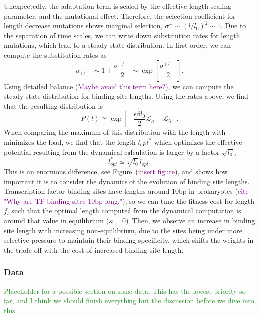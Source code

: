 \documentclass[10pt,a4paper]{article}
\newcommand{\purple}[1]{\textcolor{purple}{#1}}
\begin{document}
Unexpectedly, the adaptation term is scaled by the effective length scaling parameter, and the mutational effect. Therefore, the selection coefficient for length decrease mutations shows marginal selection, $\sigma^-\sim (l/l_0)^2\sim 1$. Due to the separation of time scales, we can write down substitution rates for length mutations, which lead to a steady state distribution. In first order, we can compute the substitution rates as 
\begin{equation}
	u_{+/-} \sim 1 + \frac{\sigma^{+/-}}{2} \sim \exp\left[\frac{\sigma^{+/-}}{2} \right].
\end{equation}
Using detailed balance (\purple{Maybe avoid this term here?}), we can compute the steady state distribution for binding site lengths. Using the rates above, we find that the resulting distribution is
\begin{equation}
	P(l) \simeq \exp\left[-\frac{\epsilon\beta l_0}{2}\mathcal{L}_\kappa - \mathcal{L}_\lambda\right].
	\label{equ:length_distribution}
\end{equation}
When comparing the maximum of this distribution with the length with minimizes the load, we find that the length $l_opt^*$ which optimizes the effective potential resulting from the dynamical calculation is larger by a factor $\sqrt{l_0}$,
\begin{equation}
	l_{opt}^* \simeq \sqrt{l_0}\,l_{opt}.
\end{equation}
This is an enormous difference, see Figure~(\purple{insert figure}), and shows how important it is to consider the dynamics of the evolution of binding site lengths. Transcription factor binding sites have lengths around 10bp in prokaryotes (\purple{cite "Why are TF binding sites 10bp long."}), so we can tune the fitness cost for length $f_l$ such that the optimal length computed from the dynamical computation is around that value in equilibrium ($\kappa=0$). Then, we observe an increase in binding site length with increasing non-equilibrium, due to the sites being under more selective pressure to maintain their binding specificity, which shifts the weights in the trade off with the cost of increased binding site length.

\subsubsection*{Data}
\textcolor{ForestGreen}{Placeholder for a possible section on some data. This has the lowest priority so far, and I think we should finish everything but the discussion before we dive into this.}
\end{document}
